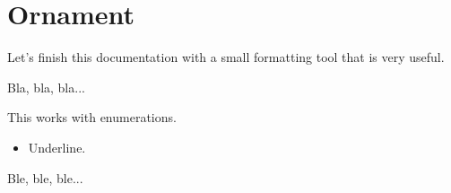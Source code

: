 \documentclass{tutodoc}
\begin{document}
\section{Ornament}

Let's finish this documentation with a small formatting tool that is very useful.


\begin{tdoclatex}
Bla, bla, bla...

\tdocsep %

This works with enumerations.

\begin{itemize}
    \item Underline.
\end{itemize}

\tdocsep %

Ble, ble, ble...
\end{tdoclatex}
\end{document}
